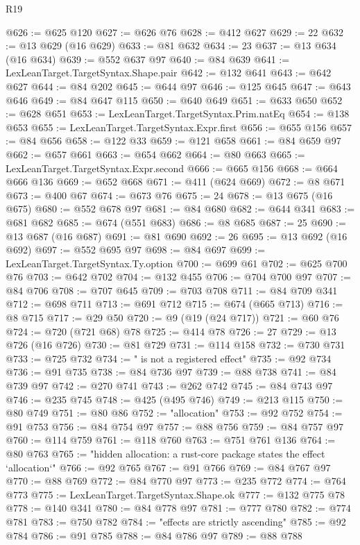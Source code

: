 \begin{lexlean}{R19}
\begin{coremodule}
{{{{{{{{{{{{{{{{{{{{{{{{{{{{{{{{{{{{{{{{{{{{{{{{{{{{{{{{{{{{{{{{{{{{{{{{{{{{{{{{{{{{{{{@626 := @625 @120
@627 := @626 @76
@628 := @412 @627
@629 := 22
@632 := @13 @629 (@16 @629)
@633 := @81 @632
@634 := 23
@637 := @13 @634 (@16 @634)
@639 := @552 @637 @97
@640 := @84 @639
@641 := LexLeanTarget.TargetSyntax.Shape.pair
@642 := @132 @641
@643 := @642 @627
@644 := @84 @202
@645 := @644 @97
@646 := @125 @645
@647 := @643 @646
@649 := @84 @647 @115
@650 := @640 @649
@651 := @633 @650
@652 := @628 @651
@653 := LexLeanTarget.TargetSyntax.Prim.natEq
@654 := @138 @653
@655 := LexLeanTarget.TargetSyntax.Expr.first
@656 := @655 @156
@657 := @84 @656
@658 := @122 @33
@659 := @121 @658
@661 := @84 @659 @97
@662 := @657 @661
@663 := @654 @662
@664 := @80 @663
@665 := LexLeanTarget.TargetSyntax.Expr.second
@666 := @665 @156
@668 := @664 @666 @136
@669 := @652 @668
@671 := @411 (@624 @669)
@672 := @8 @671
@673 := @400 @67
@674 := @673 @76
@675 := 24
@678 := @13 @675 (@16 @675)
@680 := @552 @678 @97
@681 := @84 @680
@682 := @644 @341
@683 := @681 @682
@685 := @674 (@551 @683)
@686 := @8 @685
@687 := 25
@690 := @13 @687 (@16 @687)
@691 := @81 @690
@692 := 26
@695 := @13 @692 (@16 @692)
@697 := @552 @695 @97
@698 := @84 @697
@699 := LexLeanTarget.TargetSyntax.Ty.option
@700 := @699 @61
@702 := @625 @700 @76
@703 := @642 @702
@704 := @132 @455
@706 := @704 @700 @97
@707 := @84 @706
@708 := @707 @645
@709 := @703 @708
@711 := @84 @709 @341
@712 := @698 @711
@713 := @691 @712
@715 := @674 (@665 @713)
@716 := @8 @715
@717 := @29 @50
@720 := @9 (@19 (@24 @717))
@721 := @60 @76
@724 := @720 (@721 @68) @78
@725 := @414 @78
@726 := 27
@729 := @13 @726 (@16 @726)
@730 := @81 @729
@731 := @114 @158
@732 := @730 @731
@733 := @725 @732
@734 := " is not a registered effect"
@735 := @92 @734
@736 := @91 @735
@738 := @84 @736 @97
@739 := @88 @738
@741 := @84 @739 @97
@742 := @270 @741
@743 := @262 @742
@745 := @84 @743 @97
@746 := @235 @745
@748 := @425 (@495 @746)
@749 := @213 @115
@750 := @80 @749
@751 := @80 @86
@752 := "allocation"
@753 := @92 @752
@754 := @91 @753
@756 := @84 @754 @97
@757 := @88 @756
@759 := @84 @757 @97
@760 := @114 @759
@761 := @118 @760
@763 := @751 @761 @136
@764 := @80 @763
@765 := "hidden allocation: a rust-core package states the effect `allocation`"
@766 := @92 @765
@767 := @91 @766
@769 := @84 @767 @97
@770 := @88 @769
@772 := @84 @770 @97
@773 := @235 @772
@774 := @764 @773
@775 := LexLeanTarget.TargetSyntax.Shape.ok
@777 := @132 @775 @78
@778 := @140 @341
@780 := @84 @778 @97
@781 := @777 @780
@782 := @774 @781
@783 := @750 @782
@784 := "effects are strictly ascending"
@785 := @92 @784
@786 := @91 @785
@788 := @84 @786 @97
@789 := @88 @788
}}}}}}}}}}}}}}}}}}}}}}}}}}}}}}}}}}}}}}}}}}}}}}}}}}}}}}}}}}}}}}}}}}}}}}}}}}}}}}}}}}}}}}}
\end{coremodule}
\end{lexlean}
